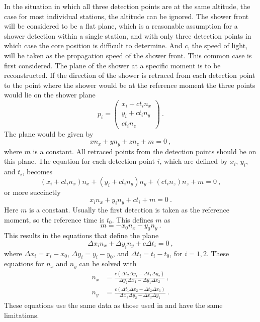 In the situation in which all three detection points are at the same altitude, the case for most individual stations, the altitude can be ignored. The shower front will be considered to be a flat plane, which is a reasonable assumption for a shower detection within a single station, and with only three detection points in which case the core position is difficult to determine. And $c$, the speed of light, will be taken as the propagation speed of the shower front. This common case is first considered. The plane of the shower at a specific moment is to be reconstructed. If the direction of the shower is retraced from each detection point to the point where the shower would be at the reference moment the three points would lie on the shower plane
%
\begin{equation}
    p_i = \begin{pmatrix}
              x_i + c t_i n_x \\
              y_i + c t_i n_y \\
                    c t_i n_z
          \end{pmatrix} \ .
\end{equation}
%
The plane would be given by
%
\begin{equation}
    x n_x + y n_y + z n_z + m = 0 \ ,
\end{equation}
%
where $m$ is a constant. All retraced points from the detection points should be on this plane. The equation for each detection point $i$, which are defined by $x_i$, $y_i$, and $t_i$, becomes
%
\begin{equation}
    (x_i + c t_i n_x) n_x + (y_i + c t_i n_y) n_y + (c t_i n_z) n_z + m = 0 \ ,
\end{equation}
%
or more succinctly
%
\begin{equation}
    x_i n_x + y_i n_y + c t_i + m = 0 \ .
\end{equation}
%
Here $m$ is a constant. Usually the first detection is taken as the reference moment, so the reference time is $t_0$. This defines $m$ as
%
\begin{equation}
    m = - x_0 n_x - y_0 n_y \ .
\end{equation}
%
This results in the equations that define the plane
%
\begin{equation}
    \Delta x_i n_x + \Delta y_i n_y + c \Delta t_i = 0 \ ,
\end{equation}
%
where $\Delta x_i = x_i - x_0$, $\Delta y_i = y_i - y_0$, and $\Delta t_i = t_i - t_0$, for $i = 1,2$.
%
These equations for $n_x$ and $n_y$ can be solved with
%
\begin{equation}
    \begin{aligned}
        n_x &= \frac{c (\Delta t_2 \Delta y_1 - \Delta t_1 \Delta y_2)}
                     {\Delta y_2 \Delta x_1 - \Delta y_1 \Delta x_2} \ , \\
        n_y &= \frac{c (\Delta t_1 \Delta x_2 - \Delta t_2 \Delta x_1)}
                     {\Delta x_1 \Delta y_2 - \Delta x_2 \Delta y_1} \ .
    \end{aligned}
\end{equation}
%
These equations use the same data as those used in \cite{fokkema2012hisparc} and have the same limitations.



